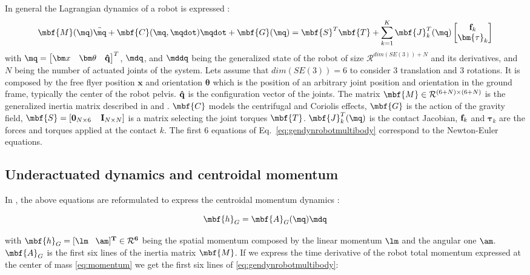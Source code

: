 In general the Lagrangian dynamics of a robot is expressed :
\begin{equation}
\mbf{M}(\mq) \ddot{\mq}  + \mbf{C}(\mq, \mqdot)\mqdot + \mbf{G}(\mq) = \mbf{S}^T \mbf{T} + \sum\limits_{k=1}^{K} \mbf{J}_k^T(\mq)
\begin{bmatrix}
{\bf f}_k \\
\bm{\tau}_k
\end{bmatrix}
\label{eq:gendynrobotmultibody}
\end{equation}
%
with $\mq = \begin{bmatrix}
{\bm x} &
{\bm \theta} &
{\bf \hat{q}}
\end{bmatrix} ^T
$, $\mdq$, and $\mddq$ being the generalized state of the robot of size $\mathcal{R}^{dim(SE(3))+N}$ and its derivatives, and $N$ being the number of actuated joints of the system.
Lets assume that $dim(SE(3))=6$ to consider 3 translation and 3 rotations.
It is composed by the free flyer position ${\bm x}$ and orientation ${\bm \theta}$ which is the position of an arbitrary joint position and orientation in the ground frame, typically the center of the robot pelvis.
${\bf \hat{q}}$ is the configuration vector of the joints.
The matrix $\mbf{M} \in \mathcal{R}^{(6+N)\times(6+N)}$ is the generalized inertia matrix described in \cite{Wieber:FMBR:2005} and \cite {phdthesis:sherikov:2016}.
$\mbf{C}$ models the centrifugal and Coriolis effects,
$\mbf{G}$ is the action of the gravity field,
$\mbf{S} = [{\bf 0}_{N \times 6} \;\;\;\; {\bf I}_{N \times N}]$ is a matrix selecting the joint torques $\mbf{T}$.
$ \mbf{J}_k^T(\mq) $ is the contact Jacobian, ${\bf f}_k$ and $\bm{\tau}_k$ are the forces and torques applied at the contact $k$.
The first 6 equations of Eq.~\ref{eq:gendynrobotmultibody} correspond to the Newton-Euler equations.

\subsection*{Underactuated dynamics and centroidal momentum}

In \cite{Orin:autorob:2013}, the above equations are reformulated to express the centroidal momentum dynamics :

\begin{equation}
\mbf{h}_G = \mbf{A}_G (\mq) \mdq
\label{eq:momentum}
\end{equation}

with $\mbf{h}_G = [\bf \lm \;\;\; \am]^T \in \mathcal{R}^{6}$ being the spatial momentum composed by the linear momentum ${\bf \lm}$ and the angular one ${\bf \am}$.
$\mbf{A}_G$ is the first six lines of the inertia matrix $\mbf{M}$.
If we express the time derivative of the robot total momentum expressed at the center of mass \eqref{eq:momentum} we get the first six lines of \eqref{eq:gendynrobotmultibody}:

